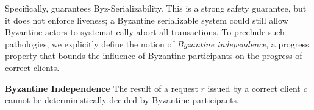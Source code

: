 %
%

Specifically, \sys{} guarantees Byz-Serializability.  This is a strong safety guarantee, but it does not enforce liveness; a Byzantine serializable system could still allow Byzantine actors to systematically abort all transactions. To preclude such pathologies, we explicitly define the notion of \textit{Byzantine independence}, a progress  property that bounds the influence of Byzantine participants on the progress of correct clients.




  \par \textbf{Byzantine Independence} The result of a request $r$ issued by a correct client $c$ cannot be deterministically decided by Byzantine participants. %
 

